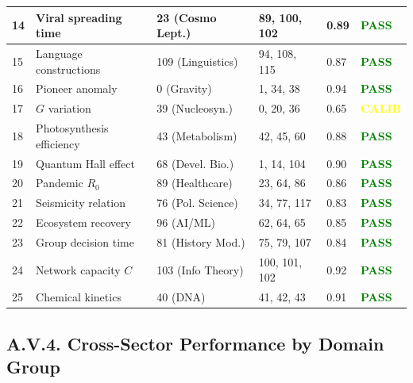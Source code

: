 \documentclass[13pt,a4paper]{article}
\begin{document}
\begin{longtable}{|p{0.8cm}|p{2.5cm}|p{1.8cm}|p{1.5cm}|p{1.5cm}|p{1.8cm}|}
		\hline
		14 & Viral spreading time & 23 (Cosmo Lept.) & 89, 100, 102 & 0.89 & \textcolor{green}{\textbf{PASS}} \\
		\hline
		15 & Language constructions & 109 (Linguistics) & 94, 108, 115 & 0.87 & \textcolor{green}{\textbf{PASS}} \\
		\hline
		16 & Pioneer anomaly & 0 (Gravity) & 1, 34, 38 & 0.94 & \textcolor{green}{\textbf{PASS}} \\
		\hline
		17 & $G$ variation & 39 (Nucleosyn.) & 0, 20, 36 & 0.65 & \textcolor{yellow}{\textbf{CALIB}} \\
		\hline
		18 & Photosynthesis efficiency & 43 (Metabolism) & 42, 45, 60 & 0.88 & \textcolor{green}{\textbf{PASS}} \\
		\hline
		19 & Quantum Hall effect & 68 (Devel. Bio.) & 1, 14, 104 & 0.90 & \textcolor{green}{\textbf{PASS}} \\
		\hline
		20 & Pandemic $R_0$ & 89 (Healthcare) & 23, 64, 86 & 0.86 & \textcolor{green}{\textbf{PASS}} \\
		\hline
		21 & Seismicity relation & 76 (Pol. Science) & 34, 77, 117 & 0.83 & \textcolor{green}{\textbf{PASS}} \\
		\hline
		22 & Ecosystem recovery & 96 (AI/ML) & 62, 64, 65 & 0.85 & \textcolor{green}{\textbf{PASS}} \\
		\hline
		23 & Group decision time & 81 (History Mod.) & 75, 79, 107 & 0.84 & \textcolor{green}{\textbf{PASS}} \\
		\hline
		24 & Network capacity $C$ & 103 (Info Theory) & 100, 101, 102 & 0.92 & \textcolor{green}{\textbf{PASS}} \\
		\hline
		25 & Chemical kinetics & 40 (DNA) & 41, 42, 43 & 0.91 & \textcolor{green}{\textbf{PASS}} \\
		\hline
	\end{longtable}
	
	\subsection*{A.V.4. Cross-Sector Performance by Domain Group}
	
\end{document}
